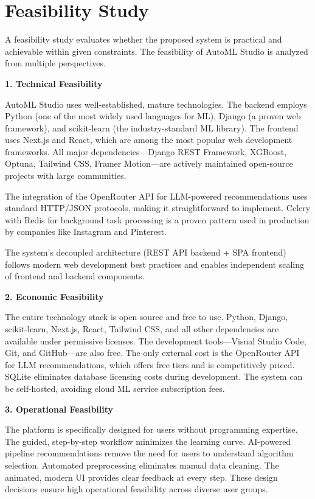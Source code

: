 \documentclass[12pt,a4paper]{report}
\begin{document}
\section{Feasibility Study}
A feasibility study evaluates whether the proposed system is practical and achievable within given constraints. The feasibility of AutoML Studio is analyzed from multiple perspectives.

\textbf{1. Technical Feasibility}

AutoML Studio uses well-established, mature technologies. The backend employs Python (one of the most widely used languages for ML), Django (a proven web framework), and scikit-learn (the industry-standard ML library). The frontend uses Next.js and React, which are among the most popular web development frameworks. All major dependencies—Django REST Framework, XGBoost, Optuna, Tailwind CSS, Framer Motion—are actively maintained open-source projects with large communities.

The integration of the OpenRouter API for LLM-powered recommendations uses standard HTTP/JSON protocols, making it straightforward to implement. Celery with Redis for background task processing is a proven pattern used in production by companies like Instagram and Pinterest.

The system's decoupled architecture (REST API backend + SPA frontend) follows modern web development best practices and enables independent scaling of frontend and backend components.

\textbf{2. Economic Feasibility}

The entire technology stack is open source and free to use. Python, Django, scikit-learn, Next.js, React, Tailwind CSS, and all other dependencies are available under permissive licenses. The development tools—Visual Studio Code, Git, and GitHub—are also free. The only external cost is the OpenRouter API for LLM recommendations, which offers free tiers and is competitively priced. SQLite eliminates database licensing costs during development. The system can be self-hosted, avoiding cloud ML service subscription fees.

\textbf{3. Operational Feasibility}

The platform is specifically designed for users without programming expertise. The guided, step-by-step workflow minimizes the learning curve. AI-powered pipeline recommendations remove the need for users to understand algorithm selection. Automated preprocessing eliminates manual data cleaning. The animated, modern UI provides clear feedback at every step. These design decisions ensure high operational feasibility across diverse user groups.
\end{document}
